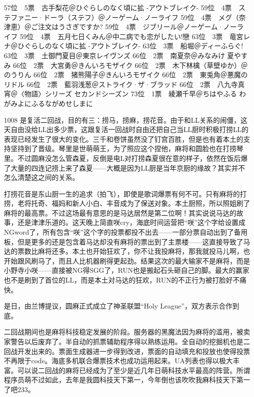     57位　5票　古手梨花＠ひぐらしのなく頃に拡 -アウトブレイク-
    59位　4票　ステファニー·ドーラ（ステフ）＠ノーゲーム·ノーライフ
    59位　4票　メグ（奈津恵）＠ご注文はうさぎですか?
    59位　4票　ジブリール＠ノーゲーム·ノーライフ
    59位　4票　五月七日くみん＠中二病でも恋がしたい!戀
    63位　3票　竜宮レナ＠ひぐらしのなく頃に拡 -アウトブレイク-
    63位　3票　船堀＠ディーふらぐ!
    63位　3票　土御門夏目＠東京レイヴンズ
    66位　2票　南夏奈＠みなみけ 夏やすみ
    66位　2票　大宮勇＠きんいろモザイク
    66位　2票　木下林檎（草壁ゆか）＠のうりん
    66位　2票　猪熊陽子＠きんいろモザイク
    66位　2票　東兎角＠悪魔のリドル
    66位　2票　藍羽浅葱＠ストライク·ザ·ブラッド
    66位　2票　八九寺真宵＠〈物語〉シリーズ セカンドシーズン
    73位　1票　綾瀬千早＠ちはやふる わがみよにふるながめせしまに

1008 是复活二回战，目的有三：捞马，捞麻，捞花音。由于和LL关系的闹僵，这天自由没给LL出多少票，这跟复活一回战时自由还把自己当LL厨时积极打捞LL的表现已经发生了很大的变化。三千和卷饼虽然没了钉宫百胜，但是也有着本土的支持坚持到了晋级。琴里是世萌萌王，为了照应这个捏他，麻将和圆脸也在打捞琴里。不过圆麻没怎么管森夏，反倒是电L对打捞森夏很在意的样子，依然在饭后爆了大量的四连记捞上来了森夏——大概是因为LL厨是当年京厨的缘故？其实并不怎么清楚这之间的关系。

打捞花音是东山厨一生的追求（拍飞），即使是歌词爆票有何不可。只有麻将的打捞，老将托奇、福妈和新人小白、丰音成为了保送对象。本土厨照，所以照姐刷了麻将的最高票。不过这场最有意思的是马达居然是第二位啊！其实说说马达的故事，还是津津乐道的。这天晚上简直咲cry，海底时间运营把“咲”这个字给设置成NGword了，所有包含“咲”这个字的投票都投不出去——一部分票自动出到了备用板，但是更多的还是包含着马达却没有麻将的票出到了主票楼——这直接导致了马达的票数比麻将还多。本土也开始狂欢了，你不让我投麻将，那我就投马儿啊，也开始跟风刷马了，而且人比机器刷得更起劲。结果这次的最大输家不是麻将，而是小野寺小咲——直接被NG得SGG了，RUN也是搬起石头砸自己的脚。最大的赢家也不是刷到了首位的LL，而是本土对马达的狂欢，RUN的不正行为被打脸好不痛快。

是日，由兰博提议，圆麻正式成立了神圣联盟“Holy League”，双方表示合作到底。

二回战期间也是麻将科技稳定发展的阶段。服务器的黑魔法因为麻将的滥用，被卖家警告以后废弃了。半自动的抓票辅助程序得以熟练运用。全自动的挖掘机也是二回战开发出来的。票面生成器进一步得到改进，票面的自动填充和投放也使得投票不再限于code。海底多机联合爆票技术也成功运用起来。UA列表也得以极大丰富。可以说二回战的麻将已经成为了至少是近几年日萌科技水平最高的阵营。所谓程序员萌不过如此，去年是我圆科技天下第一，今年倒也该吹吹我麻科技天下第一了吧233。

